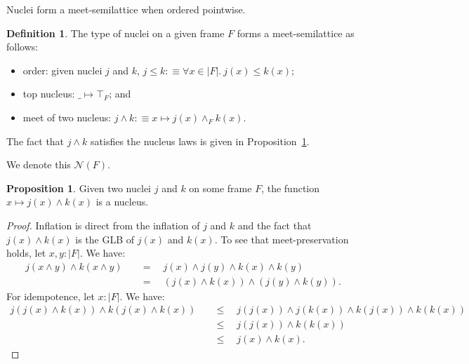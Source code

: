 \documentclass[a4paper, 11pt]{article}
\theoremstyle{definition}
\newtheorem{prop}{Proposition}
\newtheorem{defn}{Definition}
\begin{document}
Nuclei form a meet-semilattice when ordered pointwise.

\begin{defn}\label{defn:nuclei-semilattice}
  The type of nuclei on a given frame $F$ forms a meet-semilattice as follows:
  \begin{itemize}
    \item order: given nuclei $j$ and $k$, $j \le k :\equiv \forall x \in | F |.\ j(x) \le k(x)$;
    \item top nucleus: $\_ \mapsto \top_F$; and
    \item meet of two nucleus: $j \wedge k :\equiv x \mapsto j(x) \wedge_F k(x)$.
  \end{itemize}
  The fact that $j \wedge k$ satisfies the nucleus laws is given in Proposition~\ref{prop:nuclei-meet}.
\end{defn}

We denote this $\mathcal{N}(F)$.

\begin{prop}\label{prop:nuclei-meet}
  Given two nuclei $j$ and $k$ on some frame $F$, the function $x \mapsto j(x) \wedge k(x)$ is a nucleus.
\end{prop}
\begin{proof}
  Inflation is direct from the inflation of $j$ and $k$ and the fact that $j(x) \wedge k(x)$ is the GLB
  of $j(x)$ and $k(x)$. To see that meet-preservation holds, let $x, y : | F |$. We have:
  \begin{align*}
    j (x \wedge y) \wedge k (x \wedge y) &\quad=\quad j(x) \wedge j(y) \wedge k(x) \wedge k(y) \\
                          &\quad=\quad (j(x) \wedge k(x)) \wedge (j(y) \wedge k(y)).
  \end{align*}
  For idempotence, let $x : | F |$. We have:
  \begin{align*}
    j (j(x) \wedge k(x)) \wedge k(j(x) \wedge k(x)) &\quad\le\quad j(j(x)) \wedge j(k(x)) \wedge k(j(x)) \wedge k(k(x)) \\
                                     &\quad\le\quad j(j(x)) \wedge k(k(x)) & \\
                                     &\quad\le\quad j(x) \wedge k(x).
  \end{align*}
\end{proof}
\end{document}
